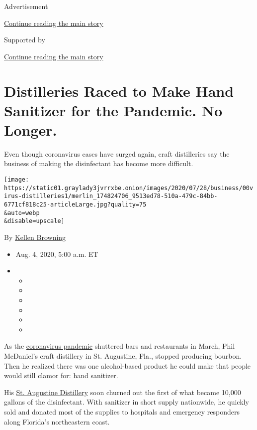 Advertisement

\protect\hyperlink{after-top}{Continue reading the main story}

Supported by

\protect\hyperlink{after-sponsor}{Continue reading the main story}

\hypertarget{distilleries-raced-to-make-hand-sanitizer-for-the-pandemic-no-longer}{%
\section{Distilleries Raced to Make Hand Sanitizer for the Pandemic. No
Longer.}\label{distilleries-raced-to-make-hand-sanitizer-for-the-pandemic-no-longer}}

Even though coronavirus cases have surged again, craft distilleries say
the business of making the disinfectant has become more difficult.

\texttt{[image: https://static01.graylady3jvrrxbe.onion/images/2020/07/28/business/00virus-distilleries1/merlin\_174824706\_9513ed78-510a-479c-84bb-6771cf818c25-articleLarge.jpg?quality=75\\\&auto=webp\\\&disable=upscale]}

By \href{https://www.nytimes3xbfgragh.onion/by/kellen-browning}{Kellen
Browning}

\begin{itemize}
\item
  Aug. 4, 2020, 5:00 a.m. ET
\item
  \begin{itemize}
  \item
  \item
  \item
  \item
  \item
  \item
  \end{itemize}
\end{itemize}

As the
\href{https://www.nytimes3xbfgragh.onion/news-event/coronavirus?action=click\&pgtype=Article\&state=default\&module=styln-coronavirus\&region=TOP_BANNER\&context=storylines_menu}{coronavirus
pandemic} shuttered bars and restaurants in March, Phil McDaniel's craft
distillery in St. Augustine, Fla., stopped producing bourbon. Then he
realized there was one alcohol-based product he could make that people
would still clamor for: hand sanitizer.

His \href{http://staugustinedistillery.com/}{St. Augustine Distillery}
soon churned out the first of what became 10,000 gallons of the
disinfectant. With sanitizer in short supply nationwide, he quickly sold
and donated most of the supplies to hospitals and emergency responders
along Florida's northeastern coast.

